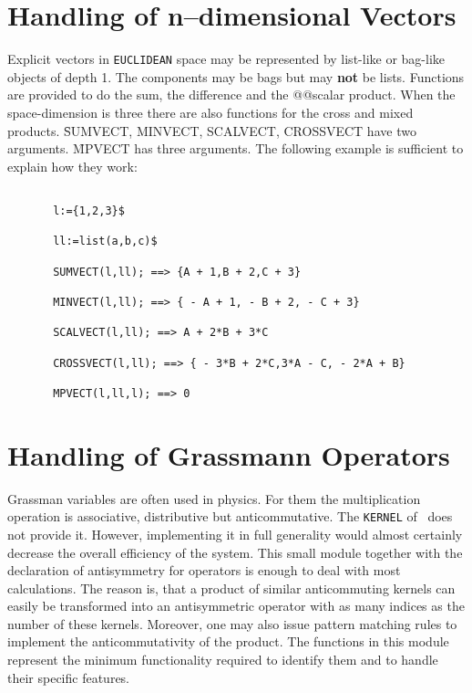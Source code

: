 \section{Handling of n--dimensional Vectors}
Explicit vectors in {\tt EUCLIDEAN} space may be represented by
list-like or bag-like objects of depth 1.
The components may be bags but may {\bf not} be lists.
Functions are provided to do the sum, the difference and the
@@scalar product. When the space-dimension is three there are also functions
for the cross and mixed products.
\f{SUMVECT, MINVECT, SCALVECT, CROSSVECT} have two arguments.
\f{MPVECT} has three arguments. The following example
is sufficient to explain how they work:
\begin{verbatim}

       l:={1,2,3}$

       ll:=list(a,b,c)$

       SUMVECT(l,ll); ==> {A + 1,B + 2,C + 3}

       MINVECT(l,ll); ==> { - A + 1, - B + 2, - C + 3}

       SCALVECT(l,ll); ==> A + 2*B + 3*C

       CROSSVECT(l,ll); ==> { - 3*B + 2*C,3*A - C, - 2*A + B}

       MPVECT(l,ll,l); ==> 0

\end{verbatim}
\section{Handling of Grassmann Operators}
Grassman variables are often used in physics. For them the multiplication
operation is associative, distributive but anticommutative. The
{\tt KERNEL} of \REDUCE\ does not provide it. However, implementing
it in full generality would almost
certainly decrease the overall efficiency of the system. This small
module together with the declaration of antisymmetry for operators is
enough to deal with most calculations. The reason is, that a
product of similar anticommuting kernels can easily  be transformed
into an antisymmetric operator with as many indices as the number of
these kernels. Moreover, one may also issue pattern matching rules
to implement the anticommutativity of the product.
The functions in this module represent the minimum functionality
required to identify them and to handle their specific features.


